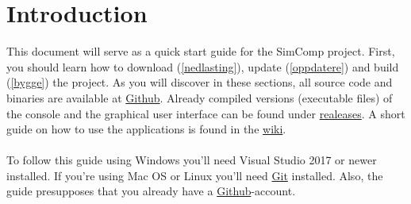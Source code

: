 \section{Introduction} \label{intro}
This document will serve as a quick start guide for the SimComp project. First, you should learn how to download (\ref{nedlasting}), update (\ref{oppdatere}) and build (\ref{bygge}) the project. As you will discover in these sections, all source code and binaries are available at \href{https://github.com/LasseNatvig/SimComp}{Github}. Already compiled versions (executable files) of the console and the graphical user interface can be found under \href{https://github.com/LasseNatvig/SimComp/releases/tag/v1.0}{realeases}. A short guide on how to use the applications is found in the \href{https://github.com/LasseNatvig/SimComp/wiki}{wiki}.  
\\
\\
To follow this guide using Windows you'll need Visual Studio 2017 or newer installed. If you're using Mac OS or Linux you'll need \href{https://git-scm.com/downloads}{Git} installed. Also, the guide presupposes that you already have a \href{https://www.github.com}{Github}-account.
